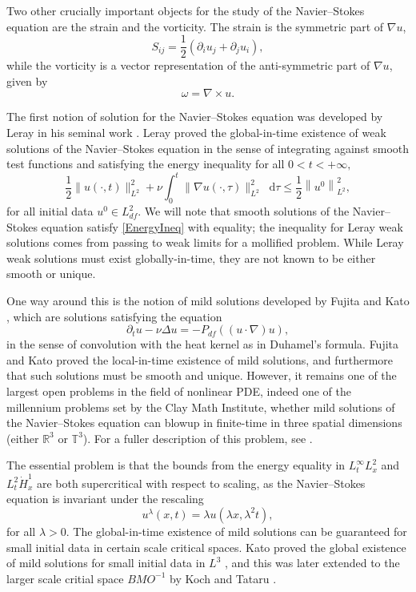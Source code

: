 \documentclass[11pt]{article}
\theoremstyle{plain}
\theoremstyle{remark}
\numberwithin{equation}{section}
\newcommand{\diff}{\mathop{}\!\mathrm{d}}
\begin{document}
Two other crucially important objects for the study of the Navier--Stokes equation are the strain and the vorticity. The strain is the symmetric part of $\nabla u$,
\begin{equation}
    S_{ij}=\frac{1}{2}(\partial_i u_j+\partial_j u_i),
\end{equation}
while the vorticity is a vector representation of the anti-symmetric part of $\nabla u$, 
given by
\begin{equation}
    \omega=\nabla \times u.
\end{equation}

The first notion of solution for the Navier--Stokes equation was developed by Leray in his seminal work \cite{Leray}.
Leray proved the global-in-time existence of weak solutions of the Navier--Stokes equation in the sense of integrating against smooth test functions and satisfying the energy inequality for all $0<t<+\infty,$
\begin{equation} \label{EnergyIneq}
    \frac{1}{2}\|u(\cdot,t)\|_{L^2}^2
    +\nu\int_0^t\|\nabla u(\cdot,\tau)\|_{L^2}^2 \diff\tau
    \leq 
    \frac{1}{2}\left\|u^0\right\|_{L^2}^2,
\end{equation}
for all initial data $u^0\in L^2_{df}$.
We will note that smooth solutions of the Navier--Stokes equation satisfy \eqref{EnergyIneq} with equality; 
the inequality for Leray weak solutions comes from passing to weak limits for a mollified problem.
While Leray weak solutions must exist globally-in-time, they are not known to be either smooth or unique.

One way around this is the notion of mild solutions developed by Fujita and Kato \cite{KatoFujita}, which are solutions satisfying the equation
\begin{equation}
    \partial_t u -\nu\Delta u
    =-P_{df}((u\cdot\nabla)u),
\end{equation}
in the sense of convolution with the heat kernel as in Duhamel's formula.
Fujita and Kato proved the local-in-time existence of mild solutions, and furthermore that such solutions must be smooth and unique. However, it remains one of the largest open problems in the field of nonlinear PDE, indeed one of the millennium problems set by the Clay Math Institute, whether mild solutions of the Navier--Stokes equation can blowup in finite-time in three spatial dimensions (either $\mathbb{R}^3$ or $\mathbb{T}^3$). For a fuller description of this problem, see \cite{ClayNS}.

The essential problem is that the bounds from the energy equality in $L^\infty_t L^2_x$ and $L^2_t\dot{H}^1_x$ are both supercritical with respect to scaling, as the Navier--Stokes equation is invariant under the rescaling
\begin{equation}
    u^\lambda(x,t)=
    \lambda u(\lambda x,\lambda^2t),
\end{equation}
for all $\lambda>0$.
The global-in-time existence of mild solutions can be guaranteed for small initial data in certain scale critical spaces. 
Kato proved the global existence of mild solutions for small initial data in $L^3$ \cite{KatoL3}, and this was later extended to the larger scale critial space $BMO^{-1}$ by Koch and Tataru \cite{KochTataru}.
\end{document}
